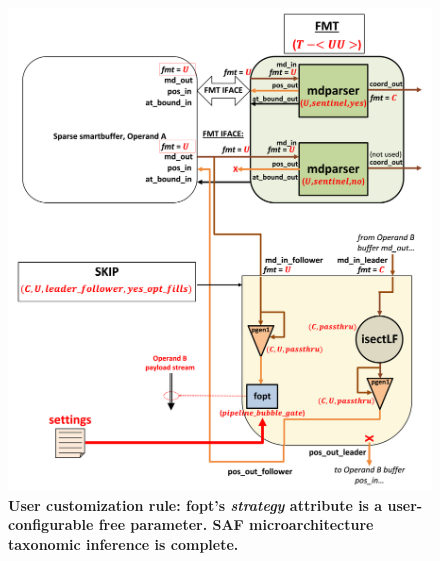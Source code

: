 \begin{figure}[ht]
\includegraphics[width=\textwidth]{figures/safinference_build_13foptstratcust.png}
\caption{\textbf{User customization rule: fopt's \textit{strategy} attribute is a user-configurable free parameter. SAF microarchitecture taxonomic inference is complete.}}
\label{fig:safinference_build_13foptstratcust}
\centering
\end{figure}